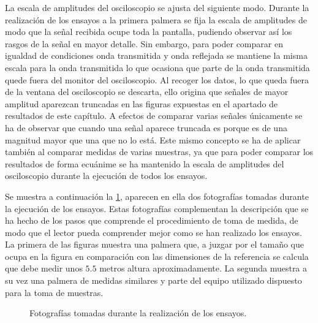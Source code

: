 La escala de amplitudes del osciloscopio se ajusta del siguiente modo.
Durante la realización de los ensayos a la primera palmera se fija la
escala de amplitudes de modo que la señal recibida ocupe toda la pantalla,
pudiendo observar así los rasgos de la señal en mayor detalle. Sin embargo,
para poder comparar en igualdad de condiciones onda transmitida y onda
reflejada se mantiene la misma escala para la onda transmitida lo que
ocasiona que parte de la onda transmitida quede fuera del monitor del
osciloscopio. Al recoger los datos, lo que queda fuera de la ventana del
osciloscopio se descarta, ello origina que señales de mayor amplitud
aparezcan truncadas en las figuras expuestas en el apartado de resultados
de este capítulo. A efectos de comparar varias señales únicamente se ha de
observar que cuando una señal aparece truncada es porque es de una magnitud
mayor que una que no lo está. Este mismo concepto se ha de aplicar también
al comparar medidas de varias muestras, ya que para poder comparar los
resultados de forma ecuánime se ha mantenido la escala de amplitudes del
osciloscopio durante la ejecución de todos los ensayos.

Se muestra a continuación la \cref{fig:tests}, aparecen en ella dos
fotografías tomadas durante la ejecución de los ensayos. Estas fotografías
complementan la descripción que se ha hecho de los pasos que comprende el
procedimiento de toma de medida, de modo que el lector pueda comprender
mejor como se han realizado los ensayos. La primera de las figuras muestra
una palmera que, a juzgar por el tamaño que ocupa en la figura en
comparación con las dimensiones de la referencia se calcula que debe medir
unos $5.5$ metros altura aproximadamente. La segunda muestra a su vez una
palmera de medidas similares y parte del equipo utilizado dispuesto para la
toma de muestras.

\begin{figure}
    \begin{center}
    \end{center}
    \caption[Fotografías tomadas durante la realización de los
    ensayos]{Fotografías tomadas durante la realización de los ensayos.}
    \label{fig:tests}
\end{figure}


